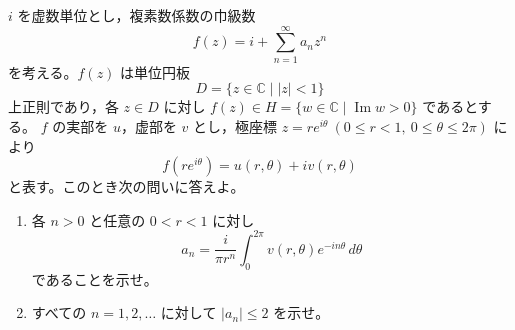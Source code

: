 \documentclass[12pt]{jlreq}
\newcommand{\C}{\mathbb{C}}
\newcommand{\Impart}{\operatorname{Im}}
\begin{document}
\(i\) を虚数単位とし，複素数係数の巾級数
\[
  f(z)=i+\sum_{n=1}^{\infty}a_n z^n
\]
を考える。\(f(z)\) は単位円板
\[
  D=\{z\in\C\mid |z|<1\}
\]
上正則であり，各 \(z\in D\) に対し \(f(z)\in H=\{w\in\C\mid \Impart w>0\}\) であるとする。
\(f\) の実部を \(u\)，虚部を \(v\) とし，極座標 \(z=re^{i\theta}\ (0\le r<1,\ 0\le \theta\le 2\pi)\) により
\[
  f(re^{i\theta})=u(r,\theta)+iv(r,\theta)
\]
と表す。このとき次の問いに答えよ。

\begin{enumerate}
  \item 各 \(n>0\) と任意の \(0<r<1\) に対し
  \[
    a_n=\frac{i}{\pi r^n}\int_{0}^{2\pi} v(r,\theta)e^{-in\theta}\,d\theta
  \]
  であることを示せ。
  \item すべての \(n=1,2,\ldots\) に対して \(|a_n|\le2\) を示せ。
\end{enumerate}
\end{document}
